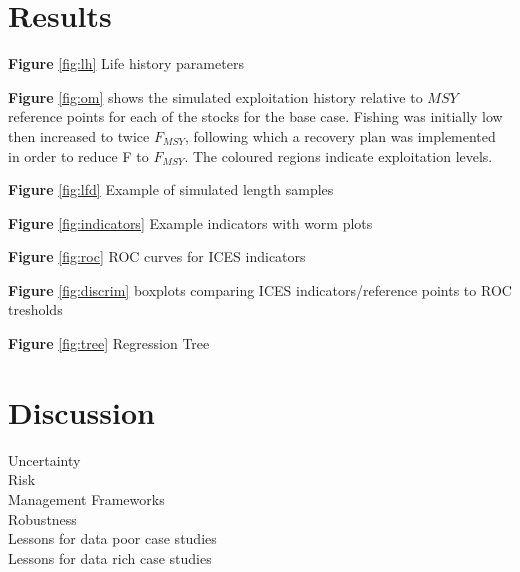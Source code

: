 \documentclass[12pt,doublespacing,a4paper]{ouparticle}
\begin{document}
\section{Results}


\textbf{Figure} \ref{fig:lh} Life history parameters

\textbf{Figure} \ref{fig:om} shows the simulated exploitation history relative to $MSY$ reference points for each of the stocks for the base case. Fishing was initially low then increased to twice $F_{MSY}$, following which a recovery plan was implemented in order to reduce F to $F_{MSY}$. The coloured regions indicate exploitation levels.

\textbf{Figure} \ref{fig:lfd} Example of simulated length samples 

\textbf{Figure} \ref{fig:indicators} Example indicators with worm plots

\textbf{Figure} \ref{fig:roc} ROC curves for ICES indicators

\textbf{Figure} \ref{fig:discrim} boxplots comparing ICES indicators/reference points to ROC tresholds

\textbf{Figure} \ref{fig:tree} Regression Tree


\section{Discussion}


\begin{description}
 \item[Uncertainty]  
 \item[Risk]     
 \item[Management Frameworks] 
 \item[Robustness]
 \item[Lessons for data poor case studies]  
 \item[Lessons for data rich case studies] 
\end{description}

\end{document}

